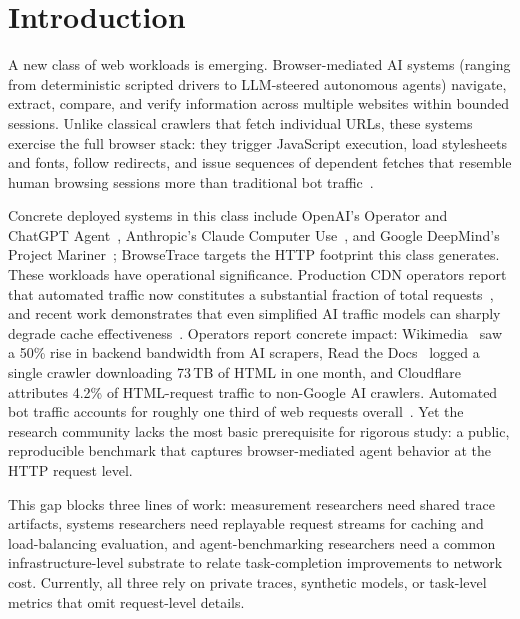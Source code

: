 \documentclass[10pt,sigconf,letterpaper,anonymous,nonacm]{acmart}
\newcommand{\sysname}{Browse\-Trace\xspace}
\begin{document}
\maketitle

\section{Introduction}
\label{sec:intro}

A new class of web workloads is emerging.  Browser-mediated AI
systems (ranging from deterministic scripted drivers to LLM-steered
autonomous agents) navigate, extract, compare, and verify information
across multiple websites within bounded sessions.  Unlike classical
crawlers that fetch individual URLs, these systems exercise the full
browser stack: they trigger JavaScript execution, load stylesheets and
fonts, follow redirects, and issue sequences of dependent fetches that
resemble human browsing sessions more than traditional bot
traffic~\cite{zhang2025}.

Concrete deployed systems in this class include OpenAI's Operator and
ChatGPT Agent~\cite{openai2025operator,openai2025chatgptagent},
Anthropic's Claude Computer Use~\cite{anthropic2024computeruse}, and
Google DeepMind's Project Mariner~\cite{google2024mariner}; \sysname
targets the HTTP footprint this class generates.
These workloads have operational significance.  Production CDN
operators report that automated traffic now constitutes a substantial
fraction of total requests~\cite{cloudflare2024bots}, and recent work
demonstrates that even simplified AI traffic models can sharply degrade
cache effectiveness~\cite{zhang2025}.
Operators report concrete impact: Wikimedia~\cite{wikimedia2025crawlers} saw a 50\% rise in backend bandwidth from AI scrapers, Read the Docs~\cite{readthedocs2024} logged a single crawler downloading 73\,TB of HTML in one month, and Cloudflare~\cite{cloudflare2025radar} attributes 4.2\% of HTML-request traffic to non-Google AI crawlers. Automated bot traffic accounts for roughly one third of web requests overall~\cite{imperva2024}.
Yet the research community lacks
the most basic prerequisite for rigorous study: a public, reproducible
benchmark that captures browser-mediated agent behavior at the HTTP
request level.

This gap blocks three lines of work: measurement researchers need
shared trace artifacts, systems researchers need replayable request
streams for caching and load-balancing evaluation, and
agent-benchmarking researchers need a common infrastructure-level
substrate to relate task-completion improvements to network cost.
Currently, all three rely on private traces, synthetic models, or
task-level metrics that omit request-level details.
\end{document}
